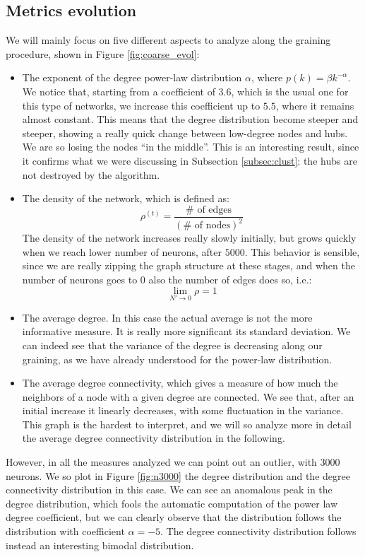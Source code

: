 \subsection{Metrics evolution}
We will mainly focus on five different aspects to analyze along the graining procedure, shown in
Figure \ref{fig:coarse_evol}:
\begin{itemize}
    \item The exponent of the degree power-law distribution $\alpha$, where $p(k)=\beta k^{-\alpha}$. We notice that, starting from a coefficient
        of $3.6$, which is the usual one for this type of networks, we increase this coefficient up to 
        $5.5$, where it remains almost constant. This means that the degree distribution become steeper 
        and steeper, showing a really quick change between low-degree nodes and hubs. We are so losing 
        the nodes “in the middle”. This is an interesting result, since it confirms what we were discussing
        in Subsection \ref{subsec:clust}: the hubs are not destroyed by the algorithm.
    \item The density of the network, which is defined as:
        \begin{equation}
            \rho^{(t)}=\frac{\# \mbox{ of edges}}{(\# \mbox{ of nodes})^2}
        \end{equation}
        The density of the network increases really slowly initially, but grows quickly when we 
        reach lower number of neurons, after $5000$. This behavior is sensible, since we are really
        zipping the graph structure at these stages, and when the number of neurons goes to $0$ also
        the number of edges does so, i.e.:
        $$
        \lim_{N'\rightarrow 0} \rho = 1
        $$
    \item The average degree. In this case the actual average is not the more informative measure. It is really more 
        significant its standard deviation. We can indeed see that the variance of the degree is decreasing 
        along our graining, as we have already understood for the power-law distribution. 
    \item The average degree connectivity, which gives a measure of how much 
        the neighbors of a node with a given degree are connected. We see that, after an initial 
        increase it linearly decreases, with some fluctuation in the variance. This graph is the hardest to
        interpret, and we will so analyze more in detail the average degree connectivity distribution in the 
        following.
\end{itemize}
However, in all the measures analyzed we can point out an outlier, with $3000$ neurons. 
We so plot in Figure \ref{fig:n3000} the degree distribution and the degree connectivity distribution in this case.
We can see an anomalous peak in the degree distribution, which fools the automatic computation of the 
power law degree coefficient, but we can clearly observe that the distribution follows the distribution
with coefficient $\alpha=-5$. The degree connectivity distribution follows instead an interesting bimodal
distribution.

